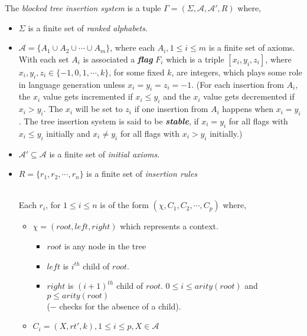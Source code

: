 \begin{definition}
The \emph{blocked tree insertion system} is a tuple
 $\Gamma = (\Sigma,\mathcal{A},\mathcal{A} ',R)$ where,\\
\begin{itemize}
    \item $\Sigma$ is a finite set of \emph{ranked alphabets}.
    \item $\mathcal{A} = \{A_1\cup A_2\cup \cdots \cup A_m\}$, where each $A_i, 1\leq i\leq m$ is a finite set of axioms.\\
    {%
With each set $A_i$ is associated  a \emph{\textbf{flag}} $F_i$ which is a triple $[x_i,y_i,z_i]$, 
	where $x_i,y_i,z_i\in\{-1,0,1,\cdots ,k\}$, for some fixed $k$, are integers,  
	which plays some role in language generation 
    unless $x_i=y_i=z_i=-1$. (For each insertion from $A_i$, the $x_i$ value gets incremented if $x_i\leq y_i$ and 
    the $x_i$ value gets decremented if $x_i>y_i$. The $x_i$ will be set to $z_i$ if one insertion from $A_i$ 
    happens when $x_i=y_i$. The tree insertion system is said to be \emph{\textbf{stable}}, if $x_i=y_i$ for all flags with 
    $x_i\leq y_i$ initially and $x_i\neq y_i$ for all flags with $x_i>y_i$ initially.)}
    \item $\mathcal{A} '\subseteq \mathcal{A}$ is a finite set of \emph{initial axioms}.
    \item $R=\{r_1,r_2,\cdots ,r_n\}$ is a finite set of \emph{insertion rules}\\\\
    {%
    Each $r_i$, for $1\leq i\leq n$ is of the form $(\chi, C_1,C_2,\cdots ,C_p)$ where, 
    \begin{itemize}    
         \item $\chi = (root,left,right)$ which represents a context.

        \begin{itemize}   
 
            \item $root$  is any node in the tree
            \item $left $ is $i^{th}$ child of $root$.%
            \item $right$ is  $(i+1)^{th}$ child of $root$.   $0\le i \le arity(root)$ and $p\leq arity(root)$\\
		($-$ checks for the absence of a child). %
                  \end{itemize}
        \item $C_i = (X,rt',k),1\leq i\leq p,X\in \mathcal{A}$ 


\end{itemize}}
\end{itemize}
\end{definition}
